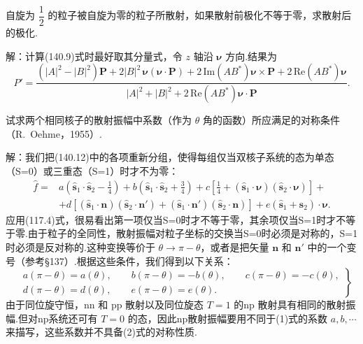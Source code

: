 \begin{xiti}

\quad 自旋为 $\dfrac{1}{2}$ 的粒子被自旋为零的粒子所散射，如果散射前极化不等于零，求散射后的极化.

解：计算(140.9)式时最好取其分量式，令 $z$ 轴沿 $\boldsymbol{\nu}$ 方向.结果为
\begin{equation*}
  P'=\frac{\left(|A|^2-|B|^2\right)\boldsymbol{P}
  +2|B|^2\,\boldsymbol{\nu}\left(\boldsymbol{\nu}\cdot\boldsymbol{P}\right)
  +2\,\mathrm{Im}\left(AB^{*}\right)\boldsymbol{\nu}\times\boldsymbol{P}
  +2\,\mathrm{Re}\left(AB^{*}\right)\boldsymbol{\nu}}
  {|A|^2+|B|^2+2\,\mathrm{Re}\left(AB^{*}\right)
  \boldsymbol{\nu}\cdot\boldsymbol{P}}.
\end{equation*}

\quad 试求两个相同核子的散射振幅中系数（作为 $\theta$ 角的函数）所应满足的对称条件（R.~Oehme，1955）.

解：我们把(140.12)中的各项重新分组，使得每组仅当双核子系统的态为单态（S=0）或三重态（S=1）时才不为零：
\setcounter{equation}{0}\renewcommand{\theequation}{\arabic{equation}}%
\begin{equation}
\begin{aligned}
  \hat{f}={}&a\left(\hat{\boldsymbol{s}}_1\cdot\hat{\boldsymbol{s}}_2
  -\frac{1}{4}\right)
  +b\left(\hat{\boldsymbol{s}}_1\cdot\hat{\boldsymbol{s}}_2
  +\frac{3}{4}\right)
  +c\left[\frac{1}{4}
  +\left(\hat{\boldsymbol{s}}_1\cdot\boldsymbol{\nu}\right)
  \left(\hat{\boldsymbol{s}}_2\cdot\boldsymbol{\nu}\right)\right]+\\
  &+d\left[\left(\hat{\boldsymbol{s}}_1\cdot\boldsymbol{n}\right)
  \left(\hat{\boldsymbol{s}}_2\cdot\boldsymbol{n}'\right)
  +\left(\hat{\boldsymbol{s}}_1\cdot\boldsymbol{n}'\right)
  \left(\hat{\boldsymbol{s}}_2\cdot\boldsymbol{n}\right)\right]
  +e\left(\hat{\boldsymbol{s}}_1+\hat{\boldsymbol{s}}_2\right)
  \cdot\boldsymbol{\nu}.
\end{aligned}
\end{equation}
应用(117.4)式，很易看出第一项仅当S=0时才不等于零，其余项仅当S=1时才不等于零.由于粒子的全同性，散射振幅对粒子坐标的交换当S=0时必须是对称的，S=1时必须是反对称的.这种变换等价于 $\theta\to\pi-\theta$，或者是把矢量 $\boldsymbol{n}$ 和 $\boldsymbol{n}'$ 中的一个变号（参考§137）.根据这些条件，我们得到以下关系：
\begin{equation}
\left.
\begin{aligned}
  &a(\pi-\theta)=a(\theta),\qquad
  b(\pi-\theta)=-b(\theta),\qquad
  c(\pi-\theta)=-c(\theta),\\
  &d(\pi-\theta)=d(\theta),\qquad
  e(\pi-\theta)=e(\theta).
\end{aligned}
\right\}
\end{equation}
由于同位旋守恒，nn 和 pp 散射以及同位旋态 $T=1$ 的np 散射具有相同的散射振幅.但对np系统还可有 $T=0$ 的态，因此np散射振幅要用不同于(1)式的系数 $a,b,\cdots$ 来描写，这些系数并不具备(2)式的对称性质.

\end{xiti}
\setcounter{equation}{0}%

